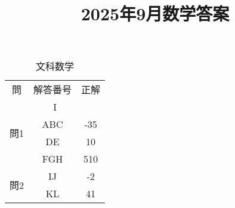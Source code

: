 \documentclass{jsarticle}
\title{\textbf{2025年9月数学答案}}
\date{}
\begin{document}
\maketitle
\begin{CJK}{UTF8}{min}

\begin{table}[htbp]
\centering
\renewcommand{\arraystretch}{1.1}
\begin{minipage}[t]{0.48\textwidth}
\centering
\caption*{文科数学}
\begin{tabular}{|c|c|c|}
\hline
\multirow{2}{*}{問} & \multirow{2}{*}{解答番号} & \multirow{2}{*}{正解} \\
 &  & \\
\hline
\multicolumn{3}{|c|}{I} \\
\hline
\multirow{2}{*}{問1} 
 & \textsf{ABC} & -35 \\
 & \textsf{DE} & 10 \\
 & \textsf{FGH} & 510 \\

\hline
\multirow{4}{*}{問2} 
 & \textsf{IJ} & -2 \\
 & \textsf{KL} & 41 \\


\end{tabular}
\end{minipage}
\end{table}
\end{CJK}
\end{document}
